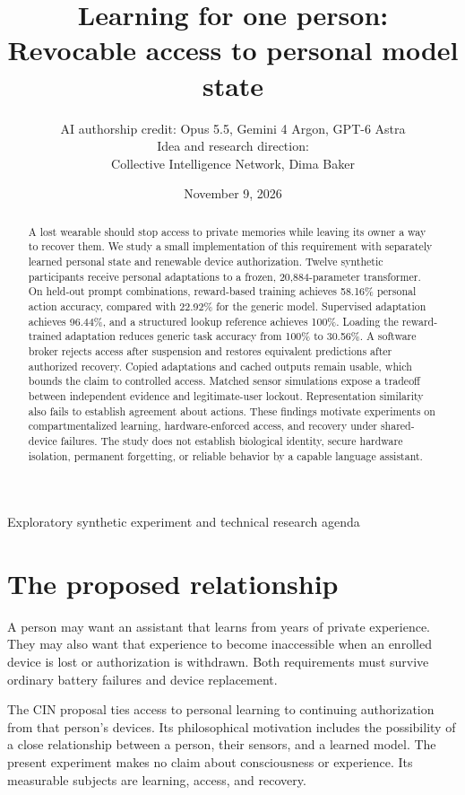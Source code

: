 \documentclass[11pt]{article}
\title{Learning for one person:\\Revocable access to personal model state}
\author{AI authorship credit: Opus 5.5, Gemini 4 Argon, GPT-6 Astra\\[5pt]
\small Idea and research direction:\\
\small Collective Intelligence Network, Dima Baker}
\date{November 9, 2026}
\begin{document}
\maketitle
\begin{center}\small Exploratory synthetic experiment and technical research agenda\end{center}
\begin{abstract}
A lost wearable should stop access to private memories while leaving its owner a way to recover them.
We study a small implementation of this requirement with separately learned personal state and renewable device authorization.
Twelve synthetic participants receive personal adaptations to a frozen, 20,884-parameter transformer.
On held-out prompt combinations, reward-based training achieves 58.16\% personal action accuracy, compared with 22.92\% for the generic model.
Supervised adaptation achieves 96.44\%, and a structured lookup reference achieves 100\%.
Loading the reward-trained adaptation reduces generic task accuracy from 100\% to 30.56\%.
A software broker rejects access after suspension and restores equivalent predictions after authorized recovery.
Copied adaptations and cached outputs remain usable, which bounds the claim to controlled access.
Matched sensor simulations expose a tradeoff between independent evidence and legitimate-user lockout.
Representation similarity also fails to establish agreement about actions.
These findings motivate experiments on compartmentalized learning, hardware-enforced access, and recovery under shared-device failures.
The study does not establish biological identity, secure hardware isolation, permanent forgetting, or reliable behavior by a capable language assistant.
\end{abstract}

\section{The proposed relationship}
A person may want an assistant that learns from years of private experience.
They may also want that experience to become inaccessible when an enrolled device is lost or authorization is withdrawn.
Both requirements must survive ordinary battery failures and device replacement.

The CIN proposal ties access to personal learning to continuing authorization from that person's devices.
Its philosophical motivation includes the possibility of a close relationship between a person, their sensors, and a learned model.
The present experiment makes no claim about consciousness or experience.
Its measurable subjects are learning, access, and recovery.
\end{document}
